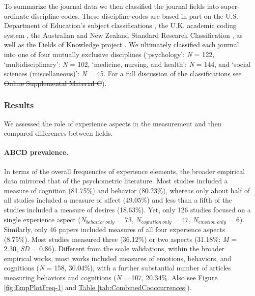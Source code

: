 \documentclass[man, 12pt, a4paper, mask]{apa7}
\newcommand{\fgrref}[2][]{\hyperref[#2]{Figure \ref*{#2}#1}}
\newcommand{\tblref}[2][]{\hyperref[#2]{Table \ref*{#2}#1}}
\newcommand{\siannotatedanalyses}{Supplemental Material B} %
\providecommand{\DIFaddtex}[1]{{\protect\color{blue}\uwave{#1}}} %
\providecommand{\DIFdeltex}[1]{{\protect\color{red}\sout{#1}}}                      %
\providecommand{\DIFaddbegin}{} %
\providecommand{\DIFaddend}{} %
\providecommand{\DIFdelbegin}{} %
\providecommand{\DIFdelend}{} %
\providecommand{\DIFadd}[1]{\texorpdfstring{\DIFaddtex{#1}}{#1}} %
\providecommand{\DIFdel}[1]{\texorpdfstring{\DIFdeltex{#1}}{}} %
\newcommand{\DIFscaledelfig}{0.5}
\newlength{\DIFdelgraphicswidth} %
\newlength{\DIFdelgraphicsheight} %
\newcommand{\DIFaddincludegraphics}[2][]{{\color{blue}\fbox{\DIFOincludegraphics[#1]{#2}}}} %
\newcommand{\DIFdelincludegraphics}[2][]{%
\sbox{\DIFdelgraphicsbox}{\DIFOincludegraphics[#1]{#2}}%
\settoboxwidth{\DIFdelgraphicswidth}{\DIFdelgraphicsbox} %
\settoboxtotalheight{\DIFdelgraphicsheight}{\DIFdelgraphicsbox} %
\scalebox{\DIFscaledelfig}{%
\parbox[b]{\DIFdelgraphicswidth}{\usebox{\DIFdelgraphicsbox}\\[-\baselineskip] \rule{\DIFdelgraphicswidth}{0em}}\llap{\resizebox{\DIFdelgraphicswidth}{\DIFdelgraphicsheight}{%
\setlength{\unitlength}{\DIFdelgraphicswidth}%
\begin{picture}(1,1)%
\thicklines\linethickness{2pt} %
{\color[rgb]{1,0,0}\put(0,0){\framebox(1,1){}}}%
{\color[rgb]{1,0,0}\put(0,0){\line( 1,1){1}}}%
{\color[rgb]{1,0,0}\put(0,1){\line(1,-1){1}}}%
\end{picture}%
}\hspace*{3pt}}} %
} %
\DeclareRobustCommand{\DIFaddbegin}{\DIFOaddbegin \let\includegraphics\DIFaddincludegraphics} %
\DeclareRobustCommand{\DIFaddend}{\DIFOaddend \let\includegraphics\DIFOincludegraphics} %
\DeclareRobustCommand{\DIFdelbegin}{\DIFOdelbegin \let\includegraphics\DIFdelincludegraphics} %
\DeclareRobustCommand{\DIFdelend}{\DIFOaddend \let\includegraphics\DIFOincludegraphics} %
\begin{document}
To summarize the journal data we then classified the journal fields into
super-ordinate discipline codes. These discipline codes are based in
part on the U.S. Department of Education's subject classifications
\citep[i.e., CIP,][]{InstituteofEducationSciences2020}, the U.K.
academic coding system
\citep[JACS 3.0,][]{HigherEducationStatisticsAgency2013}, the Australian
and New Zealand Standard Research Classification
\citep[ANZSRC 2020,][]{AustralianBureauofStatistics2020}, as well as the
Fields of Knowledge project \citep{ThingsmadeThinkable2014}. We
ultimately classified each journal into one of four mutually exclusive
disciplines (`psychology': \textit{N} = 122, `multidisciplinary':
\textit{N} = 102, `medicine, nursing, and health': \textit{N} = 144, and
`social sciences (miscellaneous)': \textit{N} = 45. For a full
discussion of the classifications see \DIFdelbegin \DIFdel{Online Supplemental Material C}\DIFdelend \DIFaddbegin \DIFadd{\siannotatedanalyses}\DIFaddend ).

\subsubsection{Results}

We assessed the role of experience aspects in the measurement and then
compared differences between fields.

\paragraph{ABCD prevalence.}

In terms of the overall frequencies of experience elements, the broader
empirical data mirrored that of the psychometric literature. Most
studies included a measure of cognition (81.75\%) and behavior
(80.23\%), whereas only about half of all studies included a measure of
affect (49.05\%) and less than a fifth of the studies included a measure
of desires (18.63\%). Yet, only 126 studies focused on a single
experience aspect (\(N_{behavior\ only}\) = 73, \(N_{cognition\ only}\)
= 47, \(N_{emotion\ only}\) = 6). Similarly, only 46 papers included
measures of all four experience aspects (8.75\%). Most studies measured
three (36.12\%) or two aspects (31.18\%; \textit{M} = 2.30, \textit{SD}
= 0.86). Different from the scale validations, within the broader
empirical works, most works included measures of emotions, behaviors,
and cognitions (\textit{N} = 158, 30.04\%), with a further substantial
number of articles measuring behaviors and cognitions (\textit{N} = 107,
20.34\%. Also see \fgrref{fig:EmpPlotFreq-1} and
\tblref{tab:CombinedCooccurrences}).
\end{document}
